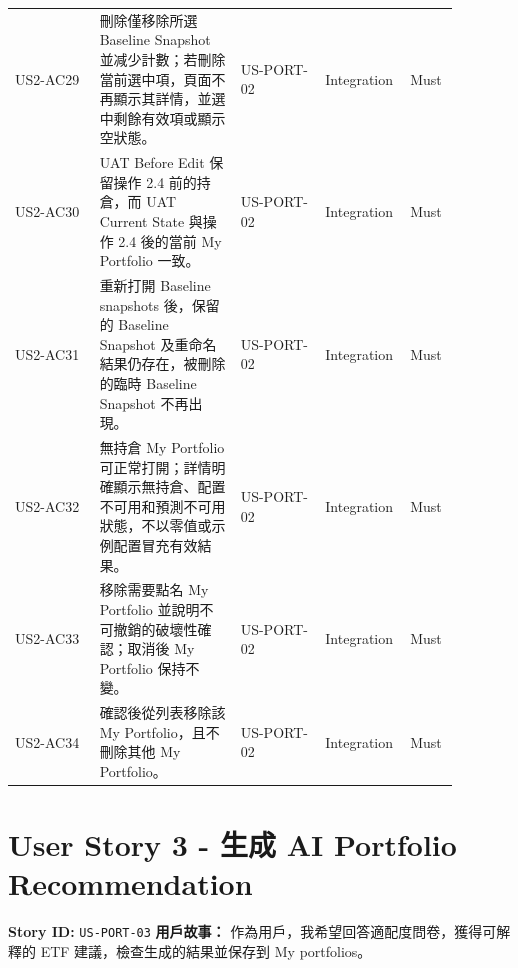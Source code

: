 \begin{longtable}{L{0.18\linewidth}L{0.30\linewidth}L{0.18\linewidth}L{0.12\linewidth}L{0.10\linewidth}}
US2-AC29 & 刪除僅移除所選 Baseline Snapshot 並减少計數；若刪除當前選中項，頁面不再顯示其詳情，並選中剩餘有效項或顯示空狀態。 & US-PORT-02 & Integration & Must \\
US2-AC30 & UAT Before Edit 保留操作 2.4 前的持倉，而 UAT Current State 與操作 2.4 後的當前 My Portfolio 一致。 & US-PORT-02 & Integration & Must \\
US2-AC31 & 重新打開 Baseline snapshots 後，保留的 Baseline Snapshot 及重命名結果仍存在，被刪除的臨時 Baseline Snapshot 不再出現。 & US-PORT-02 & Integration & Must \\
US2-AC32 & 無持倉 My Portfolio 可正常打開；詳情明確顯示無持倉、配置不可用和預測不可用狀態，不以零值或示例配置冒充有效結果。 & US-PORT-02 & Integration & Must \\
US2-AC33 & 移除需要點名 My Portfolio 並說明不可撤銷的破壞性確認；取消後 My Portfolio 保持不變。 & US-PORT-02 & Integration & Must \\
US2-AC34 & 確認後從列表移除該 My Portfolio，且不刪除其他 My Portfolio。 & US-PORT-02 & Integration & Must \\
\bottomrule
\end{longtable}
\endgroup
\prdhr
\hypertarget{us-port-03}{}
\section{User Story 3 - 生成 AI Portfolio Recommendation}
\textbf{Story ID:} \texttt{US-PORT-03}
\textbf{用戶故事：} 作為用戶，我希望回答適配度問卷，獲得可解釋的 ETF 建議，檢查生成的結果並保存到 My portfolios。
